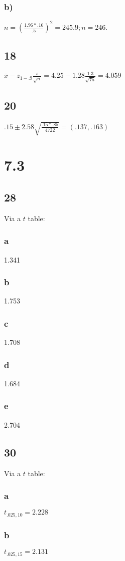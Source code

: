 \documentclass{article}
\begin{document}
		\subsubsection*{b)}
			$ n = \left ( \frac{1.96*.16}{.5} \right )^2 = 245.9; n = 246.$	
	\subsection*{18}
		$\overline{x} - z_{1-.9} \frac{s}{\sqrt{n}} = 4.25 - 1.28 \frac{1.3}{\sqrt{75}} = 4.059$	
	\subsection*{20}
		$.15 \pm 2.58 \sqrt{ \frac{.15*.85}{4722}} = (.137, .163)$
\section*{7.3}
	\subsection*{28}
	Via a $t$ table:
		\subsubsection*{a} 1.341
		\subsubsection*{b} 1.753
		\subsubsection*{c} 1.708
		\subsubsection*{d} 1.684
		\subsubsection*{e} 2.704
	\subsection*{30}
	Via a $t$ table:			
		\subsubsection*{a} $t_{.025, 10} = 2.228$
		\subsubsection*{b} $t_{.025, 15} = 2.131$
\end{document}
